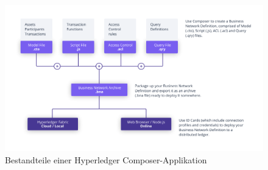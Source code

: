         \begin{figure}[H]
    		\centering
    		\includegraphics[width=\textwidth]{graphics/Composer-Diagram.png}
    		\caption[Bestandteile einer Hyperledger Composer-Applikation]{Bestandteile einer Hyperledger Composer-Applikation\cite{ComposerDocs}}
    		\label{fig:composer_arch}
    	\end{figure}
        
